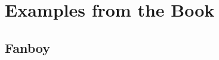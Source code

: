\documentclass[presentation]{beamer}\mode<presentation>{\usetheme{AMSBolognaFC}}
\begin{document}
\section[Examples from the \jason{} Book]{Examples from the \jason{} Book}

\subsection{Fanboy}

\end{document}

